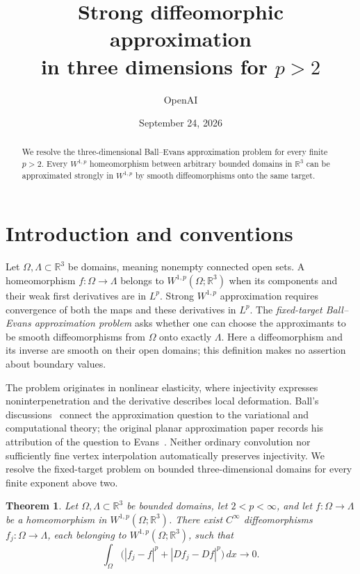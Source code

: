 \documentclass[11pt]{article}
\title{Strong diffeomorphic approximation\\in three dimensions for $p>2$}
\author{OpenAI}
\date{September 24, 2026}
\numberwithin{equation}{section}
\newtheorem{theorem}{Theorem}[section]
\theoremstyle{definition}
\theoremstyle{remark}
\begin{document}
\begin{abstract}
We resolve the three-dimensional Ball--Evans approximation problem for every
finite $p>2$. Every $W^{1,p}$ homeomorphism between arbitrary bounded domains
in $\mathbb R^3$ can be approximated strongly in $W^{1,p}$ by smooth diffeomorphisms
onto the same target.
\end{abstract}
\section{Introduction and conventions}\label{sec:introduction}

Let $\Omega,\Lambda\subset\mathbb R^3$ be domains, meaning nonempty connected
open sets.  A homeomorphism $f:\Omega\to\Lambda$ belongs to
$W^{1,p}(\Omega;\mathbb R^3)$ when its components and their weak first
derivatives are in $L^p$.  Strong $W^{1,p}$ approximation requires
convergence of both the maps and these derivatives in $L^p$.
The \emph{fixed-target Ball--Evans approximation problem} asks whether
one can choose the approximants to be smooth diffeomorphisms from
$\Omega$ onto exactly $\Lambda$.  Here a diffeomorphism and its inverse
are smooth on their open domains; this definition makes no assertion
about boundary values.

The problem originates in nonlinear elasticity, where injectivity
expresses noninterpenetration and the derivative describes local
deformation.  Ball's discussions~\cite{Ball2001,Ball2002,Ball2010}
connect the approximation question to the variational and computational
theory; the original planar approximation paper records his attribution
of the question to Evans~\cite{IwaniecKovalevOnninen2011}.
Neither ordinary convolution nor sufficiently fine vertex interpolation
automatically preserves injectivity.  We resolve the fixed-target
problem on bounded three-dimensional domains for every finite exponent
above two.

\begin{theorem}\label{main:theorem}\label{ha:approximation}
Let $\Omega,\Lambda\subset\mathbb R^3$ be bounded domains, let $2<p<\infty$,
and let $f:\Omega\to\Lambda$ be a homeomorphism in
$W^{1,p}(\Omega;\mathbb R^3)$. There exist $C^\infty$ diffeomorphisms
$f_j:\Omega\to\Lambda$, each belonging to
$W^{1,p}(\Omega;\mathbb R^3)$, such that
\begin{equation}\label{main:convergence}
\int_\Omega\bigl( |f_j-f|^p+|Df_j-Df|^p\bigr)\,dx\longrightarrow0.
\end{equation}
\end{theorem}
\end{document}

